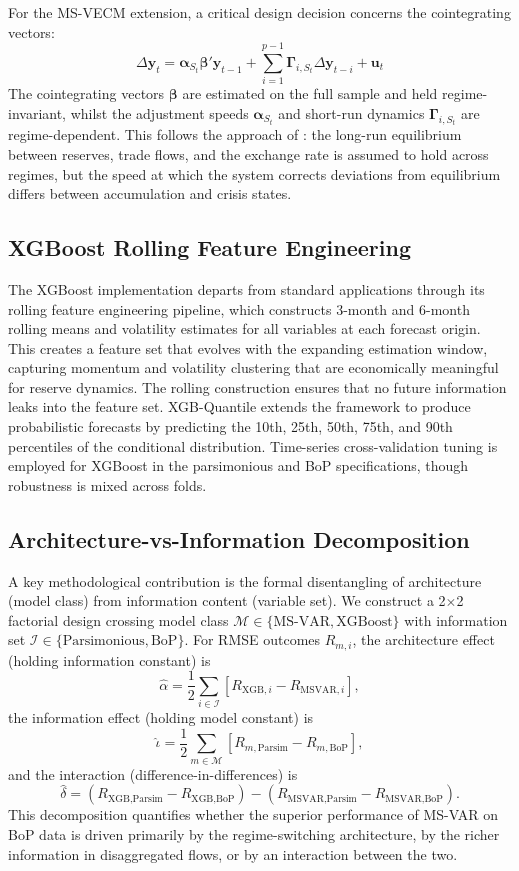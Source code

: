 \documentclass[12pt,a4paper]{article}
\begin{document}
For the MS-VECM extension, a critical design decision concerns the cointegrating vectors:
\[
\Delta \mathbf{y}_t = \boldsymbol{\alpha}_{S_t} \boldsymbol{\beta}' \mathbf{y}_{t-1} + \sum_{i=1}^{p-1} \boldsymbol{\Gamma}_{i,S_t} \Delta \mathbf{y}_{t-i} + \mathbf{u}_t
\]
The cointegrating vectors $\boldsymbol{\beta}$ are estimated on the full sample and held regime-invariant, whilst the adjustment speeds $\boldsymbol{\alpha}_{S_t}$ and short-run dynamics $\boldsymbol{\Gamma}_{i,S_t}$ are regime-dependent. This follows the approach of \cite{Krolzig1997}: the long-run equilibrium between reserves, trade flows, and the exchange rate is assumed to hold across regimes, but the speed at which the system corrects deviations from equilibrium differs between accumulation and crisis states.

\subsection{XGBoost Rolling Feature Engineering}

The XGBoost implementation departs from standard applications through its rolling feature engineering pipeline, which constructs 3-month and 6-month rolling means and volatility estimates for all variables at each forecast origin. This creates a feature set that evolves with the expanding estimation window, capturing momentum and volatility clustering that are economically meaningful for reserve dynamics. The rolling construction ensures that no future information leaks into the feature set. XGB-Quantile extends the framework to produce probabilistic forecasts by predicting the 10th, 25th, 50th, 75th, and 90th percentiles of the conditional distribution. Time-series cross-validation tuning is employed for XGBoost in the parsimonious and BoP specifications, though robustness is mixed across folds.

\subsection{Architecture-vs-Information Decomposition}

A key methodological contribution is the formal disentangling of architecture (model class) from information content (variable set). We construct a 2$\times$2 factorial design crossing model class $\mathcal{M} \in \{\text{MS-VAR}, \text{XGBoost}\}$ with information set $\mathcal{I} \in \{\text{Parsimonious}, \text{BoP}\}$. For RMSE outcomes $R_{m,i}$, the architecture effect (holding information constant) is
\[
\hat{\alpha} = \frac{1}{2}\sum_{i \in \mathcal{I}} \left[ R_{\text{XGB},i} - R_{\text{MSVAR},i} \right],
\]
the information effect (holding model constant) is
\[
\hat{\iota} = \frac{1}{2}\sum_{m \in \mathcal{M}} \left[ R_{m,\text{Parsim}} - R_{m,\text{BoP}} \right],
\]
and the interaction (difference-in-differences) is
\[
\hat{\delta} = \left(R_{\text{XGB,Parsim}} - R_{\text{XGB,BoP}}\right) - \left(R_{\text{MSVAR,Parsim}} - R_{\text{MSVAR,BoP}}\right).
\]
This decomposition quantifies whether the superior performance of MS-VAR on BoP data is driven primarily by the regime-switching architecture, by the richer information in disaggregated flows, or by an interaction between the two.
\end{document}
